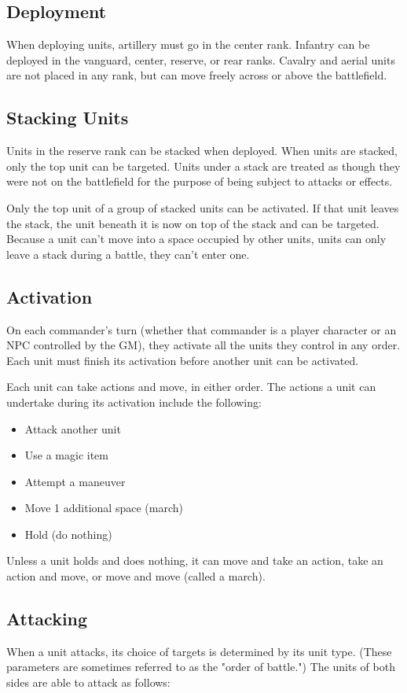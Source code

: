 \documentclass[10pt,a4paper,twoside,bg=print,twocolumn,openany,nodeprecatedcode]{dndbook}
\begin{document}
\subsection{Deployment}
When deploying units, artillery must go in the center rank. Infantry can be deployed in the vanguard, center, reserve, or rear ranks. Cavalry and aerial units are not placed in any rank, but can move freely across or above the battlefield.

\subsection{Stacking Units}
Units in the reserve rank can be stacked when deployed. When units are stacked, only the top unit can be targeted. Units under a stack are treated as though they were not on the battlefield for the purpose of being subject to attacks or effects.

Only the top unit of a group of stacked units can be activated. If that unit leaves the stack, the unit beneath it is now on top of the stack and can be targeted. Because a unit can't move into a space occupied by other units, units can only leave a stack during a battle, they can't enter one.

\subsection{Activation}
On each commander's turn (whether that commander is a player character or an NPC controlled by the GM), they activate all the units they control in any order. Each unit must finish its activation before another unit can be activated.

Each unit can take actions and move, in either order. The actions a unit can undertake during its activation include the following:


\begin{itemize}
\item Attack another unit
\item Use a magic item
\item Attempt a maneuver
\item Move 1 additional space (march)
\item Hold (do nothing)
\end{itemize}

Unless a unit holds and does nothing, it can move and take an action, take an action and move, or move and move (called a march).

\subsection{Attacking}
When a unit attacks, its choice of targets is determined by its unit type. (These parameters are sometimes referred to as the "order of battle.") The units of both sides are able to attack as follows:
\end{document}
